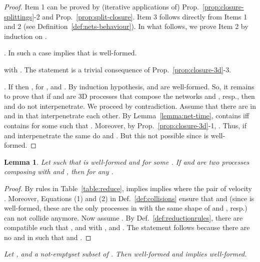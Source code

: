 \documentclass[11pt]{article}
\newtheorem{lemma}{Lemma}
\begin{document}
\par\medskip\noindent \begin{proof}
Item 1 can be proved by (iterative applications of) Prop.~\ref{prop:closure-splittings}-2 and
Prop.~\ref{prop:split-closure}. Item 3 follows directly from Items 1 and 2 (see
Definition~\ref{def:nets-behaviour}). In what follows, we prove Item 2 by induction on .
\par\medskip\noindent
 . In such a case  implies  that is  well-formed.
\par\medskip\noindent
 with . The statement is a trivial consequence of
Prop.~\ref{prop:closure-3d}-3.
\par\medskip\noindent 
. If   then , for , and . By induction hypothesis,  and  are well-formed. So, it remains to prove that if
 and  are 3D processes that compose the networks  and , resp., then  and
 do not interpenetrate. We proceed by contradiction. Assume that there are  in  and
 in  that interpenetrate each other. By Lemma~\ref{lemma:net-time},   contains 
iff  contains  for some  such  that . Moreover, by
Prop.~\ref{prop:closure-3d}-1, . Thus, if  and 
interpenetrate the same do  and . But this not possible since  is well-formed.
\end{proof}


\begin{lemma}\label{lemma:reduction-steps}
Let  such that  is well-formed and  for some 
. If  and  are two processes composing  with
 and , then  for any .
\end{lemma}

\begin{proof}
By rules in Table~\ref{table:reduce},   implies  implies  where the pair of velocity .
Moreover,  Equations (1) and (2) in Def.~\ref{def:collisions} ensure that  and  (since  is well-formed, these are the
only processes in  with the same shape of  and , resp.) can not collide anymore.
Now assume . By Def.~\ref{def:reductionrules}, there are
compatible  
such that ,  and  with ,  and . The statement follows because there  are no  and  in  such
that   and .

\end{proof}

\par\bigskip{}
\em Let ,  and  a not-emptyset subset of . Then  well-formed
and  implies  well-formed. \rm
\end{document}
